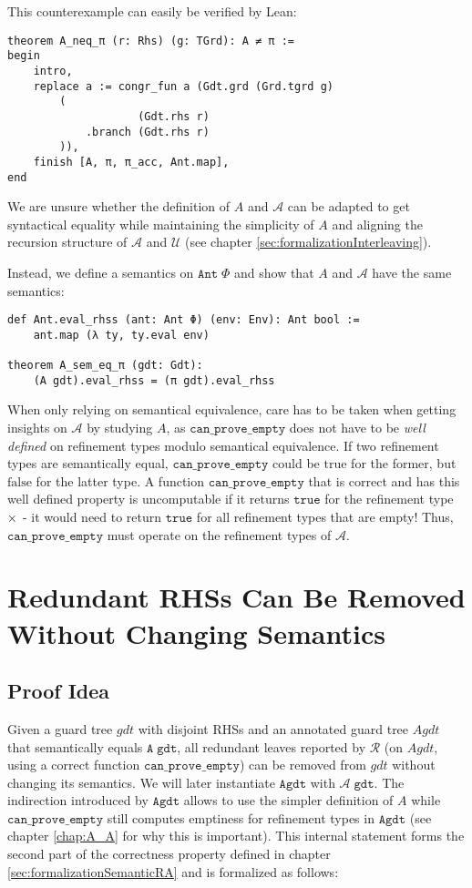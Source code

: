 This counterexample can easily be verified by Lean:
\begin{verbatim}
theorem A_neq_π (r: Rhs) (g: TGrd): A ≠ π :=
begin
    intro,
    replace a := congr_fun a (Gdt.grd (Grd.tgrd g)
        (
                    (Gdt.rhs r)
            .branch (Gdt.rhs r)
        )),
    finish [A, π, π_acc, Ant.map],
end
\end{verbatim}

We are unsure whether the definition of $A$ and $\mathcal{A}$ can be adapted to get syntactical equality
while maintaining the simplicity of $A$ and aligning the recursion structure of $\mathcal{A}$ and $\mathcal{U}$ (see chapter \ref{sec:formalizationInterleaving}).

Instead, we define a semantics on $\mathtt{Ant}\;\Phi$ and show that $A$ and $\mathcal{A}$ have the same semantics:
\begin{verbatim}
def Ant.eval_rhss (ant: Ant Φ) (env: Env): Ant bool :=
    ant.map (λ ty, ty.eval env)
    
theorem A_sem_eq_π (gdt: Gdt):
    (A gdt).eval_rhss = (π gdt).eval_rhss
\end{verbatim}

When only relying on semantical equivalence, care has to be taken when getting insights on $\mathcal{A}$ by studying $A$,
as $\mathtt{can\_prove\_empty}$ does not have to be \textit{well defined}
on refinement types modulo semantical equivalence. If two refinement types are semantically equal,
$\mathtt{can\_prove\_empty}$ could be $\mathrm{true}$ for the former, but $\mathrm{false}$ for the latter type.
A function $\mathtt{can\_prove\_empty}$ that is correct and has this well defined property is uncomputable if it returns $\mathtt{true}$ for the refinement type $\times$ - it would need to return $\mathtt{true}$ for all refinement types that are empty!
Thus, $\mathtt{can\_prove\_empty}$ must operate on the refinement types of $\mathcal{A}$.

\section{Redundant RHSs Can Be Removed Without Changing Semantics}\label{sec:proofRedRemovable}

\subsection{Proof Idea}

Given a guard tree $gdt$ with disjoint RHSs
and an annotated guard tree $Agdt$ that semantically equals $\mathtt{A}\;\mathtt{gdt}$,
all redundant leaves reported by $\mathcal{R}$ (on $Agdt$, using a correct function $\mathtt{can\_prove\_empty}$) can be removed from $gdt$ without changing its semantics.
We will later instantiate $\mathtt{Agdt}$ with $\mathcal{A}\;\mathtt{gdt}$.
The indirection introduced by $\mathtt{Agdt}$ allows to use the simpler definition of $A$ while $\mathtt{can\_prove\_empty}$ still computes emptiness for refinement types in $\mathtt{Agdt}$ (see chapter \ref{chap:A_A} for why this is important).
This internal statement forms the second part of the correctness property defined in chapter \ref{sec:formalizationSemanticRA} and is formalized as follows:

